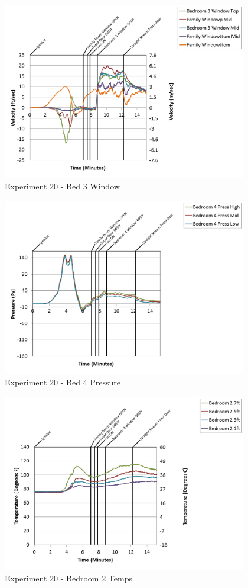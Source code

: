\documentclass{article}
\begin{document}
\begin{appendices}
\clearpage

\begin{figure}[h!]
	\centering
	\includegraphics[height=3.05in]{0_Images/Results_Charts/Exp_20_Charts/Bed3Window.png}
	\caption{Experiment 20 - Bed 3 Window}
\end{figure}


\begin{figure}[h!]
	\centering
	\includegraphics[height=3.05in]{0_Images/Results_Charts/Exp_20_Charts/Bed4Pressure.png}
	\caption{Experiment 20 - Bed 4 Pressure}
\end{figure}

\clearpage

\begin{figure}[h!]
	\centering
	\includegraphics[height=3.05in]{0_Images/Results_Charts/Exp_20_Charts/Bedroom2Temps.png}
	\caption{Experiment 20 - Bedroom 2 Temps}
\end{figure}



\end{appendices}
\end{document}
